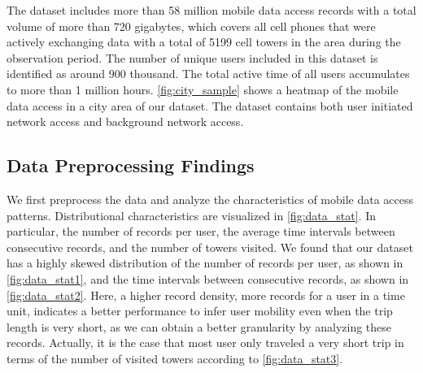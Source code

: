 

The dataset includes more than 58 million mobile data access records with a total volume of more than 720 gigabytes, which covers all cell phones that were actively exchanging data with a total of 5199 cell towers in the area during the observation period.
The number of unique users included in this dataset is identified as around 900 thousand. %
The total active time of all users accumulates to more than 1 million hours.
\autoref{fig:city_sample} shows a heatmap of the mobile data access in a city area of our dataset.
The dataset contains both user initiated network access and background network access.

\subsection{Data Preprocessing Findings}

We first preprocess the data and analyze the characteristics of mobile data access patterns.  %
Distributional characteristics are visualized in \autoref{fig:data_stat}.
In particular,
the number of records per user,
the average time intervals between consecutive records, and
the number of towers visited.
We found that our dataset has a highly skewed distribution of
the number of records per user, as shown in \autoref{fig:data_stat1}, and
the time intervals between consecutive records, as shown in \autoref{fig:data_stat2}.
Here, a higher record density, \ie more records for a user in a time unit, indicates a better performance to infer user mobility even when the trip length is very short,
as we can obtain a better granularity by analyzing these records.
Actually, it is the case that most user only traveled a very short trip in terms of the number of visited towers according to \autoref{fig:data_stat3}.

